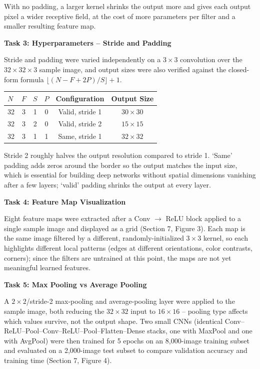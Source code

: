 \documentclass[11pt]{article}
\begin{document}
With no padding, a larger kernel shrinks the output more and gives each output pixel a wider receptive field, at the cost of more parameters per filter and a smaller resulting feature map.

\bigskip

\textbf{Task 3: Hyperparameters -- Stride and Padding}

Stride and padding were varied independently on a $3\times3$ convolution over the $32\times32\times3$ sample image, and output sizes were also verified against the closed-form formula $\lfloor(N-F+2P)/S\rfloor+1$.

\begin{center}
\begin{tabular}{|l|c|c|c|c|c|}
\hline
$N$ & $F$ & $S$ & $P$ & Configuration & Output Size\\
\hline
32 & 3 & 1 & 0 & Valid, stride 1 & $30\times30$\\
32 & 3 & 2 & 0 & Valid, stride 2 & $15\times15$\\
32 & 3 & 1 & 1 & Same, stride 1 & $32\times32$\\
\hline
\end{tabular}
\end{center}

Stride 2 roughly halves the output resolution compared to stride 1. `Same' padding adds zeros around the border so the output matches the input size, which is essential for building deep networks without spatial dimensions vanishing after a few layers; `valid' padding shrinks the output at every layer.

\bigskip

\textbf{Task 4: Feature Map Visualization}

Eight feature maps were extracted after a Conv $\rightarrow$ ReLU block applied to a single sample image and displayed as a grid (Section 7, Figure 3). Each map is the same image filtered by a different, randomly-initialized $3\times3$ kernel, so each highlights different local patterns (edges at different orientations, color contrasts, corners); since the filters are untrained at this point, the maps are not yet meaningful learned features.

\bigskip

\textbf{Task 5: Max Pooling vs Average Pooling}

A $2\times2$/stride-2 max-pooling and average-pooling layer were applied to the sample image, both reducing the $32\times32$ input to $16\times16$ -- pooling type affects which values survive, not the output shape. Two small CNNs (identical Conv--ReLU--Pool--Conv--ReLU--Pool--Flatten--Dense stacks, one with MaxPool and one with AvgPool) were then trained for 5 epochs on an 8,000-image training subset and evaluated on a 2,000-image test subset to compare validation accuracy and training time (Section 7, Figure 4).
\end{document}
